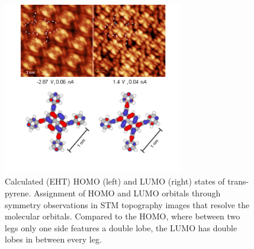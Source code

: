 



\begin{figure}[]\centering
	\includegraphics[width=0.7\textwidth]{./images/paper/pyrene/figure-S4}
	\caption{Calculated (EHT) HOMO (left) and LUMO (right) states of trans-pyrene. Assignment of HOMO and LUMO orbitals through symmetry observations in STM topography images that resolve the molecular orbitals. Compared to the HOMO, where between two legs only one side features a double lobe, the LUMO has double lobes in between every leg.}
	\label{fig:pyrene-S4}
\end{figure}

